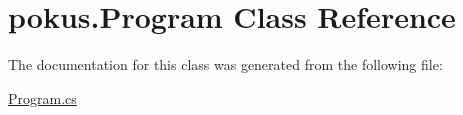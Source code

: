 \hypertarget{classpokus_1_1Program}{}\section{pokus.\+Program Class Reference}
\label{classpokus_1_1Program}


The documentation for this class was generated from the following file\+:\begin{DoxyCompactItemize}
\item 
\hyperlink{Program_8cs}{Program.\+cs}\end{DoxyCompactItemize}
